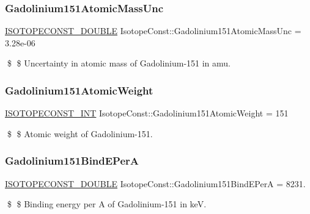 \subsubsection{\texorpdfstring{Gadolinium151\+Atomic\+Mass\+Unc}{Gadolinium151AtomicMassUnc}}
{\footnotesize\ttfamily \mbox{\hyperlink{group___isotope_const-_macros_ga8f45a7272ce02c0b4c65c44636ed719a}{I\+S\+O\+T\+O\+P\+E\+C\+O\+N\+S\+T\+\_\+\+D\+O\+U\+B\+LE}} Isotope\+Const\+::\+Gadolinium151\+Atomic\+Mass\+Unc = 3.\+28e-\/06}

\$ \$ Uncertainty in atomic mass of Gadolinium-\/151 in amu. \mbox{\label{group___isotope_const-_gadolinium-_gd151_gaded0afa0907486fa8288ca9b7e618ea6}} 
\subsubsection{\texorpdfstring{Gadolinium151\+Atomic\+Weight}{Gadolinium151AtomicWeight}}
{\footnotesize\ttfamily \mbox{\hyperlink{group___isotope_const-_macros_ga5f18360b3e99483a35c32d789e62621c}{I\+S\+O\+T\+O\+P\+E\+C\+O\+N\+S\+T\+\_\+\+I\+NT}} Isotope\+Const\+::\+Gadolinium151\+Atomic\+Weight = 151}

\$ \$ Atomic weight of Gadolinium-\/151. \mbox{\label{group___isotope_const-_gadolinium-_gd151_ga582582057938b8a55c0e647b50e15755}} 
\subsubsection{\texorpdfstring{Gadolinium151\+Bind\+E\+PerA}{Gadolinium151BindEPerA}}
{\footnotesize\ttfamily \mbox{\hyperlink{group___isotope_const-_macros_ga8f45a7272ce02c0b4c65c44636ed719a}{I\+S\+O\+T\+O\+P\+E\+C\+O\+N\+S\+T\+\_\+\+D\+O\+U\+B\+LE}} Isotope\+Const\+::\+Gadolinium151\+Bind\+E\+PerA = 8231.}

\$ \$ Binding energy per A of Gadolinium-\/151 in keV. \mbox{\label{group___isotope_const-_gadolinium-_gd151_ga362ec2ac9a7f07f0e3430e25f55f844c}} 
